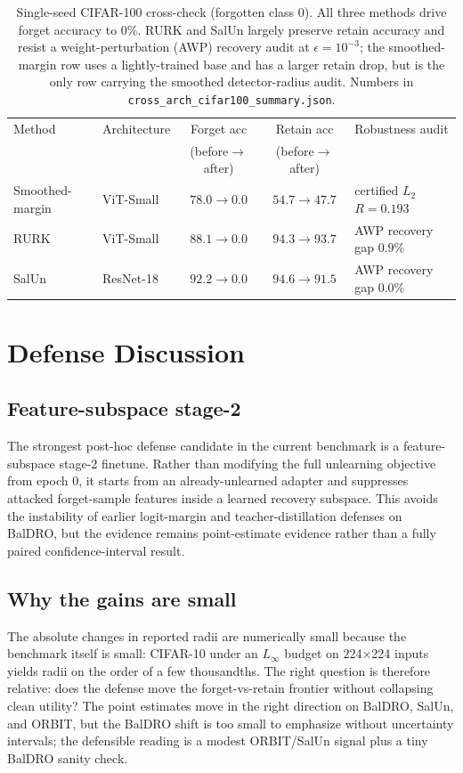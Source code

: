 \documentclass{article}
\begin{document}
\begin{table}[t]
  \centering
  \small
  \begin{tabular}{l l c c l}
    \toprule
    Method & Architecture & Forget acc & Retain acc & Robustness audit \\
     & & (before$\to$after) & (before$\to$after) & \\
    \midrule
    Smoothed-margin & ViT-Small & $78.0\to0.0$ & $54.7\to47.7$ & certified $L_2$ $R=0.193$ \\
    RURK            & ViT-Small & $88.1\to0.0$ & $94.3\to93.7$ & AWP recovery gap $0.9\%$ \\
    SalUn           & ResNet-18 & $92.2\to0.0$ & $94.6\to91.5$ & AWP recovery gap $0.0\%$ \\
    \bottomrule
  \end{tabular}
  \caption{Single-seed CIFAR-100 cross-check (forgotten class 0). All three methods drive forget accuracy to $0\%$. RURK and SalUn largely preserve retain accuracy and resist a weight-perturbation (AWP) recovery audit at $\epsilon=10^{-3}$; the smoothed-margin row uses a lightly-trained base and has a larger retain drop, but is the only row carrying the smoothed detector-radius audit. Numbers in \texttt{cross\_arch\_cifar100\_summary.json}.}
  \label{tab:crossarch}
\end{table}

\section{Defense Discussion}
\subsection{Feature-subspace stage-2}
The strongest post-hoc defense candidate in the current benchmark is a feature-subspace stage-2 finetune. Rather than modifying the full unlearning objective from epoch 0, it starts from an already-unlearned adapter and suppresses attacked forget-sample features inside a learned recovery subspace. This avoids the instability of earlier logit-margin and teacher-distillation defenses on BalDRO, but the evidence remains point-estimate evidence rather than a fully paired confidence-interval result.

\subsection{Why the gains are small}
The absolute changes in reported radii are numerically small because the benchmark itself is small: CIFAR-10 under an $L_\infty$ budget on 224$\times$224 inputs yields radii on the order of a few thousandths. The right question is therefore relative: does the defense move the forget-vs-retain frontier without collapsing clean utility? The point estimates move in the right direction on BalDRO, SalUn, and ORBIT, but the BalDRO shift is too small to emphasize without uncertainty intervals; the defensible reading is a modest ORBIT/SalUn signal plus a tiny BalDRO sanity check.
\end{document}

